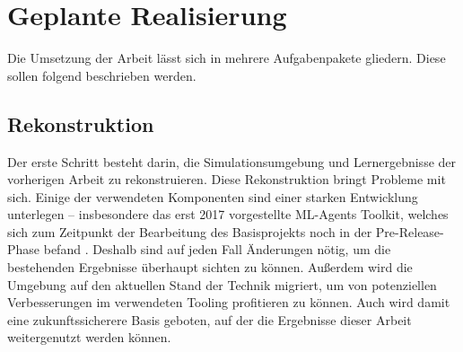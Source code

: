 
\section{Geplante Realisierung}
\label{sec:realisierung}
Die Umsetzung der Arbeit lässt sich in mehrere Aufgabenpakete gliedern.
Diese sollen folgend beschrieben werden.

\subsection{Rekonstruktion}
Der erste Schritt besteht darin, die Simulationsumgebung und Lernergebnisse der vorherigen Arbeit zu rekonstruieren.
Diese Rekonstruktion bringt Probleme mit sich.
Einige der verwendeten Komponenten sind einer starken Entwicklung unterlegen -- insbesondere das erst 2017 vorgestellte ML-Agents Toolkit, welches sich zum Zeitpunkt der Bearbeitung des Basisprojekts noch in der Pre-Release-Phase befand \cite{mlagentsHistory}.
Deshalb sind auf jeden Fall Änderungen nötig, um die bestehenden Ergebnisse überhaupt sichten zu können.
Außerdem wird die Umgebung auf den aktuellen Stand der Technik migriert, um von potenziellen Verbesserungen im verwendeten Tooling profitieren zu können.
Auch wird damit eine zukunftssicherere Basis geboten, auf der die Ergebnisse dieser Arbeit weitergenutzt werden können.

